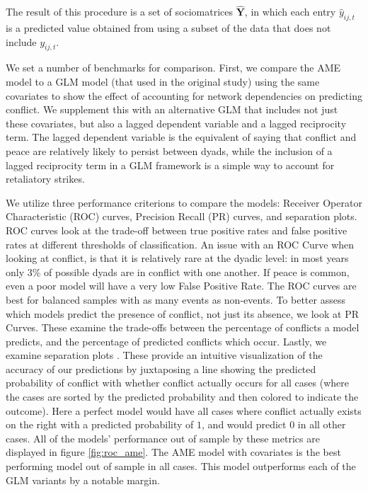 \noindent The result of this procedure is a set of sociomatrices $\bm \hat Y$, in which each entry $\hat y_{ij,t}$ is a predicted value obtained from using a subset of the data that does not include $y_{ij,t}$. 

We set a number of benchmarks for comparison. First, we compare the AME model to a GLM model (that used in the original study) using the same covariates to show the effect of accounting for network dependencies on predicting conflict. We supplement this with an alternative GLM that includes not just these covariates, but also a lagged dependent variable and a lagged reciprocity term. The lagged dependent variable is the equivalent of saying that conflict and peace are relatively likely to persist between dyads, while the inclusion of a lagged reciprocity term in a GLM framework is a simple way to account for retaliatory strikes.

We utilize three performance criterions to compare the models: Receiver Operator Characteristic (ROC) curves, Precision Recall (PR) curves, and separation plots. ROC curves look at the trade-off between true positive rates and false positive rates at different thresholds of classification. An issue with an ROC Curve when looking at conflict, is that it is relatively rare at the dyadic level: in most years only 3\% of possible dyads are in conflict with one another. If peace is common, even a poor model will have a very low False Positive Rate. The ROC curves are best for balanced samples with as many events as non-events. To better assess which models predict the presence of conflict, not just its absence, we look at PR Curves. These examine the trade-offs between the percentage of conflicts a model predicts, and the percentage of predicted conflicts which occur. Lastly, we examine separation plots \citep{greenhill:etal:2011}. These provide an intuitive visualization of the accuracy of our predictions by juxtaposing a line showing the predicted probability of conflict with whether conflict actually occurs for all cases (where the cases are sorted by the predicted probability and then colored to indicate the outcome). Here a perfect model would have all cases where conflict actually exists on the right with a predicted probability of $1$, and would predict $0$ in all other cases. All of the models' performance out of sample by these metrics are displayed in figure \ref{fig:roc_ame}. The AME model with covariates is the best performing model out of sample in all cases. This model outperforms each of the GLM variants by a notable margin.


